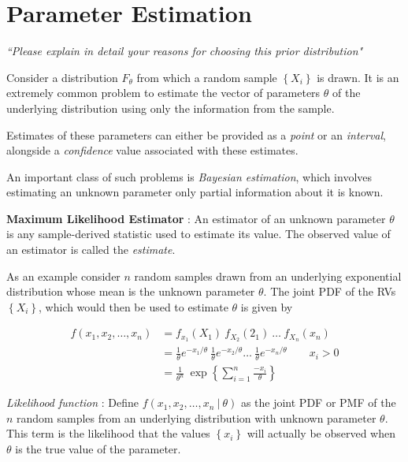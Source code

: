 \chapter{Parameter Estimation}


\begin{flushright}
	\textit{``Please explain in detail your reasons for choosing this prior distribution"}
\end{flushright}

Consider a distribution $ F_\theta $ from which a random sample $ \left\{X_i\right\} $ is drawn. It is an extremely common problem to estimate the vector of parameters $ \theta $ of the underlying distribution using only the information from the sample.

Estimates of these parameters can either be provided as a \textit{point} or an \textit{interval}, alongside a \textit{confidence} value associated with these estimates.

An important class of such problems is \textit{Bayesian estimation}, which involves estimating an unknown parameter only partial information about it is known.

\textbf{Maximum Likelihood Estimator} : An estimator of an unknown parameter $ \theta $ is any sample-derived statistic used to estimate its value. The observed value of an estimator is called the \textit{estimate}.

As an example consider $ n $ random samples drawn from an underlying exponential distribution whose mean is the unknown parameter $ \theta $. The joint PDF of the RVs $ \left\{X_i\right\} $, which would then be used to estimate $ \theta $ is given by

\begin{align}
	f(x_1, x_2, \dots, x_n) &= f_{x_1} (X_1)\ f_{X_2} (2_1)\ \dots\  f_{X_n} (x_n) \nonumber \\
	&= \frac{1}{\theta} e^{-x_1/\theta} \ \frac{1}{\theta} e^{-x_2/\theta} \dots \ \frac{1}{\theta} e^{-x_n/\theta} \qquad x_i > 0 \nonumber \\
	&= \frac{1}{\theta^n}\ \exp \left\{ \sum_{i=1}^{n} \frac{-x_i}{\theta} \right\}
\end{align}

\textit{Likelihood function} : Define $ f(x_1, x_2,\dots,x_n\ |\ \theta) $ as the joint PDF or PMF of the $ n $ random samples from an underlying distribution with unknown parameter $ \theta $. This term is the likelihood that the values $ \left\{ x_i \right\} $ will actually be observed when $ \theta $ is the true value of the parameter.

